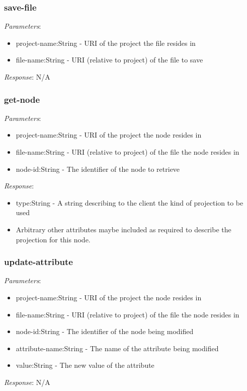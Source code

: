 \subsubsection{save-file}
\emph{Parameters}: 
\begin{itemize}
\item project-name:String - URI of the project the file resides in
\item file-name:String - URI (relative to project) of the file to save
\end{itemize}
\emph{Response}: N/A

\subsubsection{get-node}
\emph{Parameters}: 
\begin{itemize}
\item project-name:String - URI of the project the node resides in
\item file-name:String - URI (relative to project) of the file the node resides in
\item node-id:String - The identifier of the node to retrieve
\end{itemize}
\emph{Response}: 
\begin{itemize}
\item type:String - A string describing to the client the kind of projection to be used
\item Arbitrary other attributes maybe included as required to describe the projection for this node.
\end{itemize}
\subsubsection{update-attribute}
\emph{Parameters}: 
\begin{itemize}
\item project-name:String - URI of the project the node resides in
\item file-name:String - URI (relative to project) of the file the node resides in
\item node-id:String - The identifier of the node being modified
\item attribute-name:String - The name of the attribute being modified
\item value:String - The new value of the attribute
\end{itemize}
\emph{Response}: N/A

